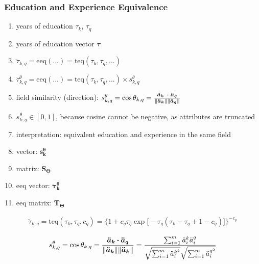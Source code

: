 \documentclass{elsarticle} %
\begin{document}
\subsubsection{Education and Experience Equivalence}
\begin{enumerate}
    \item years of education $\tau_k$, $\tau_q$
    \item years of education vector $\boldsymbol{\tau}$
    \item $\ddot{\tau}_{k,q} = \text{eeq}(...) = \text{teq}(\tau_k, \tau_q, ...)$
    \item $\ddot{\tau}_{k,q}^{\theta} = \text{eeq}(...) = \text{teq}(\tau_k, \tau_q, ...) \times s_{k,q}^{\theta}$
    \item field similarity (direction): $s_{k,q}^{\theta} = \cos\theta_{k,q} = \frac{
                  \boldsymbol{\ddot{a}_{k} \ \dotproduct\ \boldsymbol{\ddot{a}_{q}}} }{
                  \norm{\boldsymbol{\ddot{a}_{k}}} \norm{\boldsymbol{\ddot{a}_{q}}} } $
    \item $s_{k,q}^{\theta} \in [0,1]$, because cosine cannot be negative, as attributes are truncated
    \item interpretation: equivalent education and experience in the same field
    \item vector: $\boldsymbol{s_{k}^{\theta}}$
    \item matrix: $\textbf{S}_{\mathbf{\Theta}}$
    \item eeq vector: $\boldsymbol{\ddot{\tau}_{k}^{\theta}}$
    \item eeq matrix: $\boldsymbol{\ddot{\textbf{T}}_{\mathbf{\Theta}}}$
\end{enumerate}
\begin{gather}
    \ddot{\tau}_{k,q} =
    \text{teq}(\tau_k,\tau_q,c_q) =
    \big\{
    1 + c_q \tau_q
    \exp\big[
        -\tau_q (
        \tau_k - \tau_q + 1 - c_q
        )
        \big]
    \big\} ^ {-c_q}
\end{gather}

\begin{gather}
    s_{k,q}^{\theta} =
    \cos\theta_{k,q} =
    \frac{
        \boldsymbol{\ddot{a}_k}
        \dotproduct
        \boldsymbol{\ddot{a}_q}
    }{
        \norm{\boldsymbol{\ddot{a}_k}}
        \norm{\boldsymbol{\ddot{a}_k}}
    } =
    \frac{
    \sum_{i=1}^{m}{
    \ddot{a}_{i}^{k}
    \ddot{a}_{i}^{q}
    }
    }{
    \sqrt{
    \sum_{i=1}^{m}{
    \ddot{a}_{i}^{{k} ^ 2}
    }
    }
    \sqrt{
    \sum_{i=1}^{m}{
    \ddot{a}_{i}^{{q} ^ 2}
    }
    }
    }
\end{gather}
\end{document}

